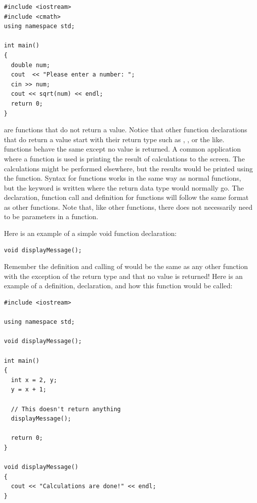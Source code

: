 \noindent\begin{minipage}{\linewidth}\begin{lstlisting}
#include <iostream>
#include <cmath>
using namespace std;
 
int main()
{
  double num;
  cout  << "Please enter a number: ";
  cin >> num;
  cout << sqrt(num) << endl;
  return 0;
}
\end{lstlisting}\end{minipage}
 
 
 are functions that do not return a value. 
Notice that other function declarations that do return a value start with their return type such as , , or the like. 
 functions behave the same except no value is returned. 
A common application where a  function is used is printing the result of calculations to the screen.
The calculations might be performed elsewhere, but the results would be printed using the  function.
Syntax for  functions works in the same way as normal functions, but the keyword  is written where the return data type would normally go. 
The declaration, function call and definition for  functions will follow the same format as other functions. 
Note that, like other functions, there does not necessarily need to be parameters in a  function.

Here is an example of a simple void function declaration:

\noindent\begin{minipage}{\linewidth}\begin{lstlisting}
void displayMessage();
\end{lstlisting}\end{minipage}

Remember the definition and calling of  would be the same as any other function with the exception of the  return type and that no value is returned! 
Here is an example of a definition, declaration, and how this function would be called:

\noindent\begin{minipage}{\linewidth}\begin{lstlisting}
#include <iostream>

using namespace std;

void displayMessage();

int main()
{
  int x = 2, y;
  y = x + 1;
  
  // This doesn't return anything
  displayMessage(); 
  
  return 0;
}

void displayMessage()
{
  cout << "Calculations are done!" << endl;
}
\end{lstlisting}\end{minipage}

